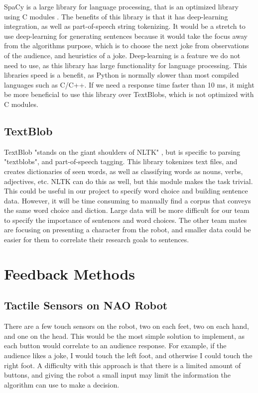 \documentclass[onecolumn, draftclsnofoot,10pt, compsoc]{IEEEtran}
\begin{document}
  SpaCy is a large library for language processing, that is an optimized library using C modules \cite{spacy}. The benefits of this library is that it has deep-learning integration, as well as part-of-speech string tokenizing. It would be a stretch to use deep-learning for generating sentences because it would take the focus away from the algorithms purpose, which is to choose the next joke from observations of the audience, and heuristics of a joke. Deep-learning is a feature we do not need to use, as this library has large functionality for language processing. This libraries speed is a benefit, as Python is normally slower than most compiled languages such as C/C++. If we need a response time faster than 10 ms, it might be more beneficial to use this library over TextBlobs, which is not optimized with C modules.
  \subsection{TextBlob}

  TextBlob "stands on the giant shoulders of NLTK" \cite{textblob}, but is specific to parsing "textblobs", and part-of-speech tagging. This library tokenizes text files, and creates dictionaries of seen words, as well as classifying words as nouns, verbs, adjectives, etc. NLTK can do this as well, but this module makes the task trivial. This could be useful in our project to specify word choice and building sentence data. However, it will be time consuming to manually find a corpus that conveys the same word choice and diction. Large data will be more difficult for our team to specify the importance of sentences and word choices. The other team mates are focusing on presenting a character from the robot, and smaller data could be easier for them to correlate their research goals to sentences.

\section{Feedback Methods}
  \subsection{Tactile Sensors on NAO Robot}
   There are a few touch sensors on the robot, two on each feet, two on each hand, and one on the head. This would be the most simple solution to implement, as each button would correlate to an audience response. For example, if the audience likes a joke, I would touch the left foot, and otherwise I could touch the right foot. A difficulty with this approach is that there is a limited amount of buttons, and giving the robot a small input may limit the information the algorithm can use to make a decision. 
\end{document}
